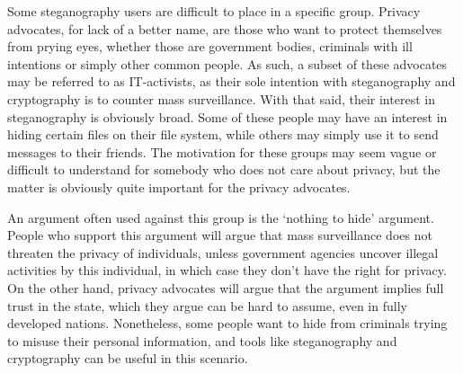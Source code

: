 Some steganography users are difficult to place in a specific group. Privacy advocates, for lack of a better name, are those who want to protect themselves from prying eyes, whether those are government bodies, criminals with ill intentions or simply other common people. As such, a subset of these advocates may be referred to as IT-activists, as their sole intention with steganography and cryptography is to counter mass surveillance. With that said, their interest in steganography is obviously broad. Some of these people may have an interest in hiding certain files on their file system, while others may simply use it to send messages to their friends. The motivation for these groups may seem vague or difficult to understand for somebody who does not care about privacy, but the matter is obviously quite important for the privacy advocates. 

An argument often used against this group is the ‘nothing to hide’ argument. People who support this argument will argue that mass surveillance does not threaten the privacy of individuals, unless government agencies uncover illegal activities by this individual, in which case they don’t have the right for privacy. On the other hand, privacy advocates will argue that the argument implies full trust in the state, which they argue can be hard to assume, even in fully developed nations. Nonetheless, some people want to hide from criminals trying to misuse their personal information, and tools like steganography and cryptography can be useful in this scenario.